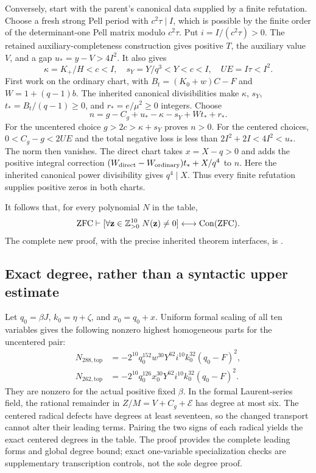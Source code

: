Conversely, start with the parent's canonical data supplied by a finite
refutation. Choose a fresh strong Pell period with
$c^2\tau\mid I$, which is possible by the finite order of the
determinant-one Pell matrix modulo $c^2\tau$. Put
$i=I/(c^2\tau)>0$. The retained auxiliary-completeness construction gives
positive $T$, the auxiliary value $V$, and a gap $u_*=y-V>4I^2$.
It also gives
\[
 \kappa=K_+/H<c<I,\quad s_Y=Y/q^3<Y<c<I,\quad
 UE=I\tau<I^2.
\]
First work on the ordinary chart, with
$B_t=(K_0+w)C-F$ and $W=1+(q-1)b$.
The inherited canonical divisibilities make $\kappa$, $s_Y$,
$t_*=B_t/(q-1)\ge0$, and $r_*=e/\mu^2\ge0$ integers. Choose
\[
 n=g-C_g+u_*-\kappa-s_Y+Wt_*+r_*.
\]
For the uncentered choice $g>2c>\kappa+s_Y$ proves $n>0$.
For the centered choices, $0<C_g-g<2UE$ and the total negative loss
is less than $2I^2+2I<4I^2<u_*$. The norm then vanishes.
The direct chart takes $x=X-q>0$ and adds the positive integral correction
$(W_{\rm direct}-W_{\rm ordinary})t_*+X/q^4$ to $n$.
Here the inherited canonical power divisibility gives $q^4\mid X$.
Thus every finite refutation supplies positive zeros in both charts.

It follows that, for every polynomial $N$ in the table,
\[
 \mathrm{ZFC}\vdash
 [\forall\mathbf z\in\mathbb Z_{>0}^{10}\;N(\mathbf z)\ne0]
 \longleftrightarrow\operatorname{Con}(\mathrm{ZFC}).
\]
The complete new proof, with the precise inherited theorem interfaces,
is .

\subsection{Exact degree, rather than a syntactic upper estimate}
Let $q_0=\beta J$, $k_0=\eta+\zeta$, and $x_0=q_0+x$.
Uniform formal scaling of all ten variables gives the following nonzero
highest homogeneous parts for the uncentered pair:
\begin{align*}
 N_{288,\mathrm{top}}
 &=-2^{10}q_0^{152}w^{30}Y^{62}i^{10}k_0^{32}(q_0-F)^2,\\
 N_{262,\mathrm{top}}
 &=-2^{10}q_0^{126}x_0^{30}Y^{62}i^{10}k_0^{32}(q_0-F)^2.
\end{align*}
They are nonzero for the actual positive fixed $\beta$.
In the formal Laurent-series field, the rational remainder in
$Z/M=V+C_g+\mathcal E$ has degree at most six. The centered radical
defects have degrees at least seventeen, so the changed transport cannot
alter their leading terms. Pairing the two signs of each radical yields
the exact centered degrees in the table. The proof provides the complete
leading forms and global degree bound; exact one-variable specialization
checks are supplementary transcription controls, not the sole degree proof.
